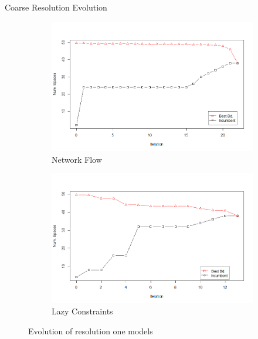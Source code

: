 \documentclass{beamer}
\begin{document}
\begin{frame}{Coarse Resolution Evolution}
    \begin{figure}
    \begin{subfigure}{.5\textwidth}
      \centering
      \includegraphics[width=1\linewidth]{figures/res1paper.png}
      \caption{Network Flow}
      \label{fig:sfig1}
    \end{subfigure}%
    \begin{subfigure}{.5\textwidth}
      \centering
      \includegraphics[width=1\linewidth]{figures/res1lazy.png}
      \caption{Lazy Constraints}
      \label{fig:sfig2}
    \end{subfigure}
    \caption{Evolution of resolution one models}
    \label{fig:fig}
    \end{figure}
\end{frame}
\end{document}
